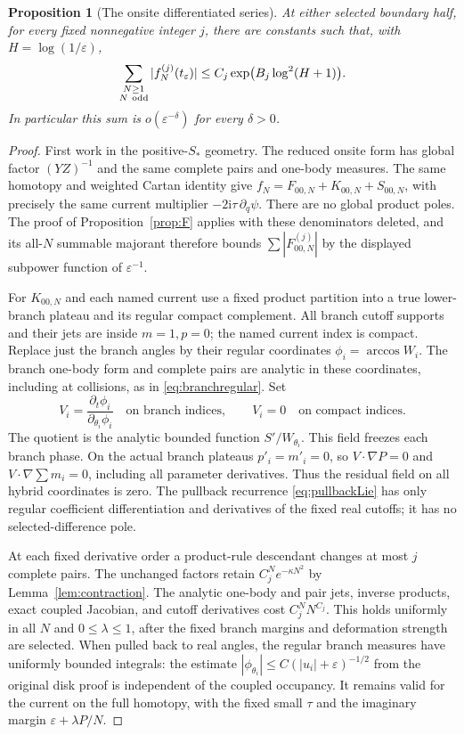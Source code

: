 \documentclass[11pt]{article}
\numberwithin{equation}{section}
\newtheorem{proposition}[theorem]{Proposition}
\theoremstyle{definition}
\newcommand{\ii}{\mathrm i}
\newcommand{\eps}{\varepsilon}
\begin{document}
\begin{proposition}[The onsite differentiated series]\label{prop:onsitesum}
At either selected boundary half, for every fixed nonnegative integer
$j$, there are constants such that, with $H=\log(1/\eps)$,
\[
 \sum_{\substack{N\ge1\\N\ {\rm odd}}}|f_N^{(j)}(t_\eps)|
 \le C_j\exp\bigl(B_j\log^2(H+1)\bigr).
\]
In particular this sum is $o(\eps^{-\delta})$ for every $\delta>0$.
\end{proposition}
\begin{proof}
First work in the positive-$S_*$ geometry. The reduced onsite form
has global factor $(YZ)^{-1}$ and the same complete pairs and
one-body measures. The same homotopy and weighted Cartan identity
give $f_N=F_{00,N}+K_{00,N}+S_{00,N}$, with precisely the same
current multiplier $-2\ii\tau\,\partial_q\psi$. There are no
global product poles. The proof of Proposition~\ref{prop:F} applies
with these denominators deleted, and its all-$N$ summable majorant
therefore bounds $\sum|F_{00,N}^{(j)}|$ by the displayed subpower
function of $\eps^{-1}$.

For $K_{00,N}$ and each named current use a fixed product partition
into a true lower-branch plateau and its regular compact complement.
All branch cutoff supports and their jets are inside $m=1,p=0$;
the named current index is compact. Replace just the branch angles
by their regular coordinates $\phi_i=\arccos W_i$. The branch
one-body form and complete pairs are analytic in these coordinates,
including at collisions, as in \eqref{eq:branchregular}. Set
\[
 V_i=\frac{\partial_t\phi_i}{\partial_{\theta_i}\phi_i}
 \quad\text{on branch indices},\qquad V_i=0
 \quad\text{on compact indices}.
\]
The quotient is the analytic bounded function $S'/W_{\theta_i}$.
This field freezes each branch phase. On the actual branch plateaus
$p'_i=m'_i=0$, so $V\cdot\nabla P=0$ and
$V\cdot\nabla\sum m_i=0$, including all parameter derivatives.
Thus the residual field on all hybrid coordinates is zero. The
pullback recurrence \eqref{eq:pullbackLie} has only regular
coefficient differentiation and derivatives of the fixed real
cutoffs; it has no selected-difference pole.

At each fixed derivative order a product-rule descendant changes
at most $j$ complete pairs. The unchanged factors retain
$C_j^N e^{-\kappa N^2}$ by Lemma~\ref{lem:contraction}. The
analytic one-body and pair jets, inverse products, exact coupled
Jacobian, and cutoff derivatives cost $C_j^N N^{C_j}$. This holds
uniformly in all $N$ and $0\le\lambda\le1$, after the fixed
branch margins and deformation strength are selected. When pulled
back to real angles, the regular branch measures have uniformly
bounded integrals: the estimate
$|\phi_{\theta_i}|\le C(|u_i|+\eps)^{-1/2}$ from the original
disk proof is independent of the coupled occupancy. It remains
valid for the current on the full homotopy, with the fixed small
$\tau$ and the imaginary margin $\eps+\lambda P/N$.


\end{proof}
\end{document}
